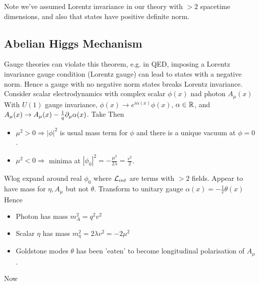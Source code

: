 \documentclass{article}
\begin{document}
Note we've assumed Lorentz invariance in our theory with $>2$ spacetime dimensions, and also that states have positive definite norm. 

\subsection{Abelian Higgs Mechanism}
Gauge theories can violate this theorem, e.g. in QED, imposing a Lorentz invariance gauge condition (Lorentz gauge) can lead to states with a negative norm. Hence a gauge with no negative norm states breaks Lorentz invariance. \\

Consider scalar electrodynamics with complex scalar $\phi(x)$ nad photon $A_\mu(x)$ 
With $U(1)$ gauge invariance, $\phi(x) \to e^{i\alpha(x)}\phi(x)$, $\alpha\in\mathbb{R}$, and $A_\mu(x) \to A_\mu(x) - \frac{1}{q} \partial_\mu \alpha(x)$. Take 
Then 

\begin{itemize}
    \item $\mu^2 > 0 \Rightarrow |\phi|^2$ is usual mass term for $\phi$ and there is a unique vacuum at $\phi=0$. 
    \item $\mu^2 < 0 \Rightarrow $ minima at $|\phi_0|^2=-\frac{\mu^2}{2\lambda} = \frac{v^2}{2}$. 
\end{itemize}
Wlog expand around real $\phi_0$ 
where $\mathcal{L}_{int}$ are terms with $>2$ fields. Appear to have mass for $\eta,A_\mu$ but not $\theta$. Transform to unitary gauge $\alpha(x) = -\frac{1}{v} \theta(x) $
Hence 
\begin{itemize}
    \item Photon has mass $m_A^2 = q^2 v^2$ 
    \item Scalar $\eta$ has mass $m_\eta^2 = 2\lambda v^2 = -2\mu^2$ 
    \item Goldstone modes $\theta$ has been 'eaten' to become longitudinal polarisation of $A_\mu$. 
\end{itemize}
Now 
\end{document}
